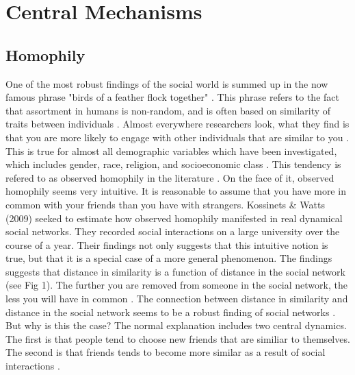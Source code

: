 \documentclass{article}
\begin{document}
\section{Central Mechanisms}
\subsection{Homophily}
One of the most robust findings of the social world is summed up in the now famous phrase "birds of a feather flock together" \cite{mcpherson_birds_2001}. This phrase refers to the fact that assortment in humans is non-random, and is often based on similarity of traits between individuals \cite{asikainen_cumulative_2020,crandall_feedback_2008,mcpherson_birds_2001}. Almost everywhere researchers look, what they find is that you are more likely to engage with other individuals that are similar to you \cite{taylor_exploring_2018}. This is true for almost all demographic variables which have been investigated, which includes gender, race, religion, and socioeconomic class \cite{asikainen_cumulative_2020,mcpherson_birds_2001}. 
This tendency is refered to as observed homophily in the literature \cite{kossinets_origins_2009,mcpherson_birds_2001}. On the face of it, observed homophily seems very intuitive. It is reasonable to assume that you have more in common with your friends than you have with strangers. 
Kossinets \& Watts (2009) seeked to estimate how observed homophily manifested in real dynamical social networks. They recorded social interactions on a large university over the course of a year. Their findings not only suggests that this intuitive notion is true, but that it is a special case of a more general phenomenon. The findings suggests that distance in similarity is a function of distance in the social network (see Fig 1). The further you are removed from someone in the social network, the less you will have in common \cite{kossinets_origins_2009}. The connection between distance in similarity and distance in the social network seems to be a robust finding of social networks \cite{bener_empirical_2016,crandall_feedback_2008}.
But why is this the case? The normal explanation includes two central dynamics. The first is that people tend to choose new friends that are similiar to themselves. The second is that friends tends to become more similar as a result of social interactions \cite{crandall_feedback_2008}. 
\end{document}
